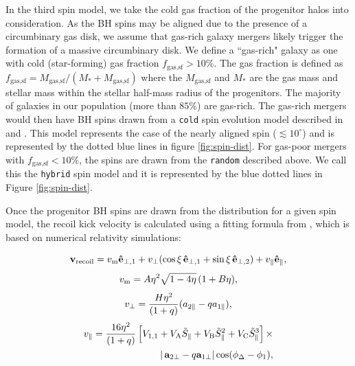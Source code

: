 \documentclass[11pt, letterpaper]{article}
\begin{document}
In the third spin model, we take the cold gas fraction of the progenitor halos into consideration. As the BH spins may be aligned due to the presence of a circumbinary gas disk, we assume that gas-rich galaxy mergers likely trigger the formation of a massive circumbinary disk. We define a ``gas-rich" galaxy as one with cold (star-forming) gas fraction $f_{\text{gas,sf}}> 10 \%$. The gas fraction is defined as $f_{\text{gas,sf}} = M_{\text{gas,sf}}/(M_{*} + M_{\text{gas,sf}})$ where the $M_{\text{gas,sf}}$ and $M_{*}$ are the gas mass and stellar mass within the stellar half-mass radius of the progenitors. The majority of galaxies in our population (more than $85 \%$) are gas-rich. The gas-rich mergers would then have BH spins drawn from a \texttt{cold} spin evolution model described in \cite{Dotti2010} and \cite{Lousto_2012}. This model represents the case of the nearly aligned spin ($\lesssim10^{\circ}$) and is represented by the dotted blue lines in figure \ref{fig:spin-dist}. For gas-poor mergers with $f_{\text{gas,sf}} <  10 \%$, the spins are drawn from the \texttt{random} described above. We call this the \texttt{hybrid} spin model and it is represented by the blue dotted lines in Figure \ref{fig:spin-dist}.

Once the progenitor BH spins are drawn from the distribution for a given spin model, the recoil kick velocity is calculated using a fitting formula from \cite{Lousto_2012}, which is based on numerical relativity simulations:

\begin{equation}
{\mathbf v_{\rm recoil}} = v_{\rm m}  {\mathbf {\hat e}_{\perp,1}}+ v_{\perp} ({\rm cos} \,\xi \, {\mathbf {\hat e}_{\perp,1}} + {\rm sin} \,\xi \, {\mathbf {\hat e}_{\perp,2}}) + v_{\parallel} {\mathbf {\hat e}_{\parallel}},
\label{eqn:kick}
\end{equation}
\begin{equation}
v_{\rm m} = A \eta^2 \sqrt{1 - 4\eta} \,(1 + B \eta), 
\end{equation}
\begin{equation}
v_{\perp} = {H \eta^2 \over (1 + q )} (a_{2\parallel} - q a_{1\parallel}),
\end{equation}
\begin{eqnarray}
v_{\parallel} = {16 \eta^2 \over (1+ q)} \left [ V_{1,1} + V_{\rm A} \tilde S_{\parallel} + V_{\rm B} \tilde S_{\parallel}^2 + V_{\rm C}\tilde S_{\parallel}^3 \right ] \times \\ \nonumber 
|\, {\mathbf a_{2\perp}} - q {\mathbf a_{1\perp}} | \, {\rm cos}(\phi_{\Delta} - \phi_1),
\end{eqnarray}
\end{document}
